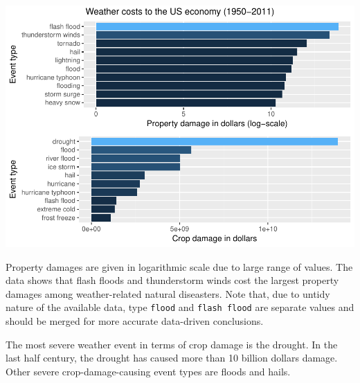 \documentclass[]{article}
\begin{document}
\includegraphics{storm_files/figure-latex/unnamed-chunk-12-1.pdf}

Property damages are given in logarithmic scale due to large range of
values. The data shows that flash floods and thunderstorm winds cost the
largest property damages among weather-related natural diseasters. Note
that, due to untidy nature of the available data, type \texttt{flood}
and \texttt{flash\ flood} are separate values and should be merged for
more accurate data-driven conclusions.

The most severe weather event in terms of crop damage is the drought. In
the last half century, the drought has caused more than 10 billion
dollars damage. Other severe crop-damage-causing event types are floods
and hails.
\end{document}
